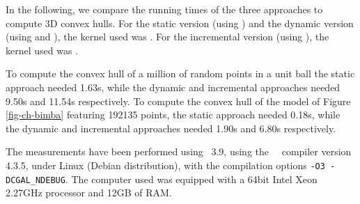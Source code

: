 In the following, we compare the running times of the three approaches to compute 3D convex hulls.
For the static version (using ) and the dynamic version
(using  and ), the kernel
used was . For the incremental version
(using ), the kernel used was .

To compute the convex hull of a million of random points in a unit ball the static approach needed 1.63s, while 
the dynamic and incremental approaches needed 9.50s and 11.54s respectively.
To compute the convex hull of the model of Figure \ref{fig-ch-bimba} featuring 192135 points, 
the static approach needed 0.18s, while the dynamic and incremental approaches needed 1.90s and 6.80s respectively.

The measurements have been performed using \cgal\ 3.9, using the \gnu\ \CC\  compiler version 4.3.5, under Linux (Debian distribution),
with the compilation options \texttt{-O3 -DCGAL\_NDEBUG}. The computer used was equipped with a 64bit Intel Xeon 2.27GHz processor and 12GB of RAM.